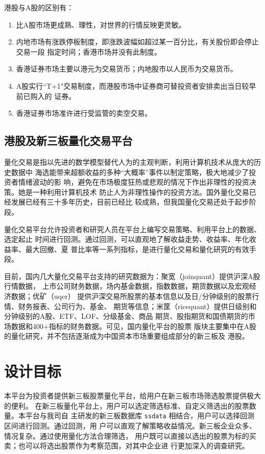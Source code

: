 \documentclass[11pt]{ctexart}
\begin{document}
港股与A股的区别有：

\begin{enumerate}
\item 比A股市场更成熟、理性，对世界的行情反映更灵敏。
\item 内地市场有涨跌停板制度，即涨跌波幅如超过某一百分比，有关股份即会停止交易一段
指定时间；香港市场并没有此制度。
\item 香港证券市场主要以港元为交易货币；内地股市以人民币为交易货币。
\item A股实行``T+1"交易制度，而港股市场中证券商可替投资者安排卖出当日较早前已购入的
证券。
\item 香港证券市场准许进行受监管的卖空交易。
\end{enumerate}

\subsection{港股及新三板量化交易平台}
\label{sec:orge68b49b}
量化交易是指以先进的数学模型替代人为的主观判断，利用计算机技术从庞大的历史数据中
海选能带来超额收益的多种“大概率”事件以制定策略，极大地减少了投资者情绪波动的影
响，避免在市场极度狂热或悲观的情况下作出非理性的投资决策。她是一种利用计算机技术
防止人为非理性操作的投资方法。国外量化交易已经发展已经有三十多年历史，目前已经比
较成熟，但我国量化交易还处于起步阶段。

量化交易平台允许投资者和研究人员在平台上编写交易策略、利用平台上的数据、选定起止
时间进行回测。通过回测，可以直观地了解收益走势、收益率、年化收益率、最大回撤、夏
普比率等一系列指标，是进行量化交易和量化研究的有效手段。

目前，国内几大量化交易平台支持的研究数据为：聚宽（joinquant）提供沪深A股行情数据，
上市公司财务数据，场内基金数据，指数数据，期货数据以及宏观经济数据；优矿（uqer）
提供沪深交易所股票的基本信息以及日/分钟级别的股票行情、财务报表、公司行为、基金、
期货等信息；米筐（ricequant）提供日级别和分钟级别的A股、ETF、LOF、分级基金、商品
期货、股指期货和国债期货的市场数据和400+指标的财务数据。可见，国内量化平台的股票
版块主要集中在A股的量化研究，并不包括逐渐成为中国资本市场重要组成部分的新三板及
港股。
\section{设计目标}
\label{sec:orgac49d5c}
本平台为投资者提供新三板股票量化平台，给用户在新三板市场筛选股票提供极大的便利。
在新三板量化平台上，用户可以选定筛选标准、自定义筛选出的股票数量。本平台与我司自
主研发的新三板数据库 \texttt{ssdata} 相结合，用户可以选择回测区间进行回测。通过回测，用
户可以直观了解策略收益情况。新三板企业众多、情况复杂。通过使用量化方法合理筛选，
用户既可以直接以选出的股票为标的买卖；也可以将选出股票作为考察范围，对其中企业进
行更加深入的调查研究。
\end{document}

